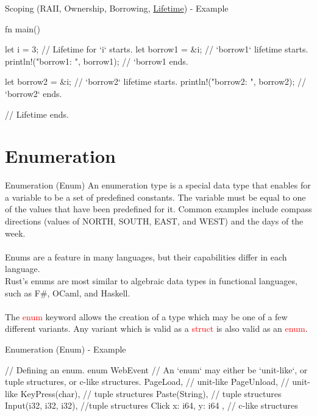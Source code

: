 \documentclass[10pt,xcolor={dvipsnames}, aspectratio=169]{beamer}
\begin{document}
	\begin{frame}[fragile]{Scoping (RAII, Ownership, Borrowing, \underline{Lifetime}) - Example}
	    \begin{rustcode}
    fn main() {
        let i = 3; // Lifetime for `i` starts.
        {
            let borrow1 = &i; // `borrow1` lifetime starts.
            println!("borrow1: {}", borrow1);                    
        } // `borrow1 ends.

        {
            let borrow2 = &i; // `borrow2` lifetime starts.
            println!("borrow2: {}", borrow2);
        } // `borrow2` ends.
    }   // Lifetime ends.
        \end{rustcode}
	\end{frame}

	\section{Enumeration}
	\begin{frame}{Enumeration (Enum)}
	    An enumeration type is a special data type that enables for a variable to be a set of predefined constants. The variable must be equal to one of the values that have been predefined for it.
	    Common examples include compass directions (values of NORTH, SOUTH, EAST, and WEST) and the days of the week.\\ \\
	    Enums are a feature in many languages, but their capabilities differ in each language.\\
	    Rust’s enums are most similar to algebraic data types in functional languages, such as F\#, OCaml, and Haskell.\\ \\
	    The \textcolor{red}{enum} keyword allows the creation of a type which may be one of a few different variants. Any variant which is valid as a  \textcolor{red}{struct} is also valid as an  \textcolor{red}{enum}.
	\end{frame}
	\begin{frame}[fragile]{Enumeration (Enum) - Example}
	    \begin{rustcode}
// Defining an enum.
enum WebEvent {
    // An `enum` may either be `unit-like`, or tuple structures, or c-like structures.
    PageLoad, // unit-like
    PageUnload, // unit-like
    KeyPress(char), // tuple structures
    Paste(String), // tuple structures
    Input(i32, i32, i32), //tuple structures
    Click { x: i64, y: i64 }, // c-like structures
}
        \end{rustcode}
    \end{frame}
\end{document}
